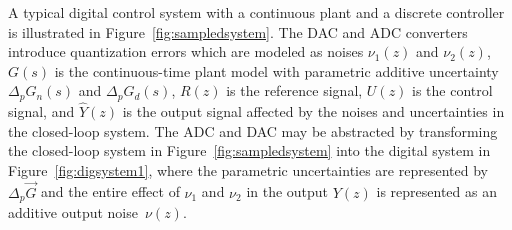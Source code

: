 \documentclass[final]{sig-alternate-05-2015}
\begin{document}
A typical digital control system with a continuous plant and a discrete
controller is illustrated in Figure~\ref{fig:sampledsystem}.  The DAC and
ADC converters introduce quantization errors which are modeled as noises
$\nu_{1}(z)$ and $\nu_{2}(z)$, $G(s)$ is the continuous-time plant model
with parametric additive uncertainty $\Delta_p{G}_n(s)$ and
$\Delta_p{G}_d(s)$, $R(z)$ is the reference signal, $U(z)$ is the control
signal, and $\hat{Y}(z)$ is the output signal affected by the noises and
uncertainties in the closed-loop system.
%
%
%
The ADC and DAC may be abstracted by transforming the closed-loop system in
Figure~\ref{fig:sampledsystem} into the digital system in 
Figure~\ref{fig:digsystem1}, where the parametric uncertainties are
represented by~$\Delta_p \vec{G}$
%
%
and the entire effect of $\nu_{1}$ and $\nu_{2}$ in the output $Y(z)$ is
represented as an additive output noise~$\nu(z)$. 
\end{document}
